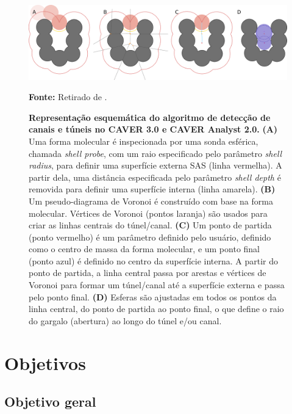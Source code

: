 \documentclass[Portugues]{phdquali}
\begin{document}
\begin{figure}[ht]
  \centerline{\includegraphics[scale=0.18]{images/caver-schema.png}}
  \centerline{\scriptsize{\textbf{Fonte:} Retirado de \cite{guerra2023B}.}}
  \caption[Representação esquemática do algoritmo de detecção de canais e túneis no CAVER 3.0 e CAVER Analyst 2.0]{\textbf{Representação esquemática do algoritmo de detecção de canais e túneis no CAVER 3.0 e CAVER Analyst 2.0.} \textbf{(A)} Uma forma molecular é inspecionada por uma sonda esférica, chamada \textit{shell probe}, com um raio especificado pelo parâmetro \textit{shell radius}, para definir uma superfície externa SAS (linha vermelha). A partir dela, uma distância especificada pelo parâmetro \textit{shell depth} é removida para definir uma superfície interna (linha amarela). \textbf{(B)} Um pseudo-diagrama de Voronoi é construído com base na forma molecular. Vértices de Voronoi (pontos laranja) são usados para criar as linhas centrais do túnel/canal. \textbf{(C)} Um ponto de partida (ponto vermelho) é um parâmetro definido pelo usuário, definido como o centro de massa da forma molecular, e um ponto final (ponto azul) é definido no centro da superfície interna. A partir do ponto de partida, a linha central passa por arestas e vértices de Voronoi para formar um túnel/canal até a superfície externa e passa pelo ponto final. \textbf{(D)} Esferas são ajustadas em todos os pontos da linha central, do ponto de partida ao ponto final, o que define o raio do gargalo (abertura) ao longo do túnel e/ou canal.}
  \label{fig:caver-schema}
\end{figure}




\chapter{Objetivos}

\section{Objetivo geral}
\end{document}
